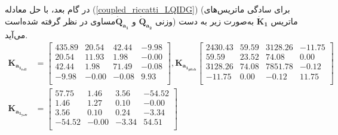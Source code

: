 در گام بعد، با حل معادله
(\ref{coupled_riccatti_LQIDG})
(برای سادگی ماتریس‌های وزنی $\boldsymbol{\dot{Q}_{a_2}}$ و $\boldsymbol{\dot{Q}_{a_1}}$مساوی در نظر گرفته شده‌است)
ماتریس
$\boldsymbol{\dot{K}_1}$
به‌صورت زیر به دست می‌آید.
\begin{equation}
	\begin{split}
			\boldsymbol{K_{a_{1_{roll}}}} &= \begin{bmatrix}
435.89 & 20.54 & 42.44 & -9.98 \\ 
20.54 & 11.93 & 1.98 & -0.00 \\ 
42.44 & 1.98 & 71.49 & -0.08 \\ 
-9.98 & -0.00 & -0.08 & 9.93 \\ 
		\end{bmatrix}, \boldsymbol{K_{a_{1_{pitch}}}} \begin{bmatrix}
2430.43 & 59.59 & 3128.26 & -11.75 \\ 
59.59 & 23.52 & 74.08 & 0.00 \\ 
3128.26 & 74.08 & 7851.78 & -0.12 \\ 
-11.75 & 0.00 & -0.12 & 11.75 \\ 
		\end{bmatrix}\\
\boldsymbol{K_{a_{1_{yaw}}}} &= 
\begin{bmatrix}
57.75 & 1.46 & 3.56 & -54.52 \\ 
1.46 & 1.27 & 0.10 & -0.00 \\ 
3.56 & 0.10 & 0.24 & -3.34 \\ 
-54.52 & -0.00 & -3.34 & 54.51 \\ 
\end{bmatrix}\\
	\end{split}
\end{equation}

